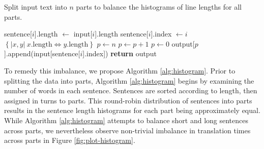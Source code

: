 \documentclass{pbml}
\begin{document}

%



\begin{algorithm}[!h]
\caption{Split input text into $n$ parts to balance the histograms of line lengths for all parts.}
\begin{algorithmic}
\State sentence[$i$].length $\gets$ input[$i$].length
\State sentence[$i$].index $\gets i$
\EndFor
\State {} $\left\{|x,y|\ x.\mbox{length}\Leftrightarrow y.\mbox{length}\right\}$ 
\State {}
\State $p \gets n$
\State $p \gets p+1$
\Else
\State $p \gets 0$
\EndIf
\State output[$p$].append(input[sentence[$i$].index])
\EndFor
\State \textbf{return} output
\EndFunction
\end{algorithmic}
\label{alg:histogram}
\end{algorithm}



To remedy this imbalance, we propose Algorithm \ref{alg:histogram}. 
%
Prior to splitting the data into parts, Algorithm \ref{alg:histogram} begins by examining the number of words in each sentence.
%
Sentences are sorted according to length, then assigned in turns to parts. 
%
This round-robin distribution of sentences into parts results in the sentence length histograms for each part being approximately equal. 
%
While Algorithm \ref{alg:histogram} attempts to balance short and long sentences across parts, we nevertheless observe non-trivial imbalance in translation times across parts in Figure \ref{fig:plot-histogram}.
\end{document}
